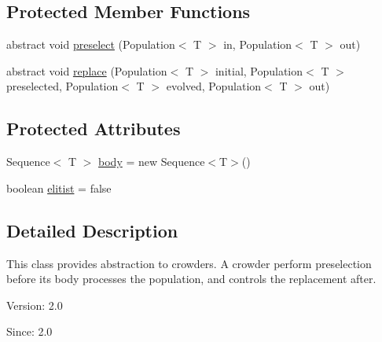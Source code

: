 \subsection*{Protected Member Functions}
\begin{CompactItemize}
\item 
abstract void \hyperlink{classjenes_1_1stage_1_1operator_1_1_crowder_3_01_t_01extends_01_chromosome_01_4_e72da3620314eba33b17297eb6a52aa0}{preselect} (Population$<$ T $>$ in, Population$<$ T $>$ out)
\item 
abstract void \hyperlink{classjenes_1_1stage_1_1operator_1_1_crowder_3_01_t_01extends_01_chromosome_01_4_2eec13cd60faaeefc6bb00302831740f}{replace} (Population$<$ T $>$ initial, Population$<$ T $>$ preselected, Population$<$ T $>$ evolved, Population$<$ T $>$ out)
\end{CompactItemize}
\subsection*{Protected Attributes}
\begin{CompactItemize}
\item 
Sequence$<$ T $>$ \hyperlink{classjenes_1_1stage_1_1operator_1_1_crowder_3_01_t_01extends_01_chromosome_01_4_81522e76967039395a3567c866fa59ed}{body} = new Sequence$<$T$>$()
\item 
boolean \hyperlink{classjenes_1_1stage_1_1operator_1_1_crowder_3_01_t_01extends_01_chromosome_01_4_5337bdf3f7d5ad8d6e09daaa3bb0636b}{elitist} = false
\end{CompactItemize}


\subsection{Detailed Description}
This class provides abstraction to crowders. A crowder perform preselection before its body processes the population, and controls the replacement after.

\begin{Desc}
\item[Version:]2.0 \end{Desc}
\begin{Desc}
\item[Since:]2.0 \end{Desc}


